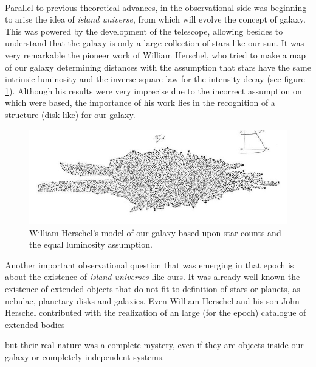 \

Parallel to previous theoretical advances, in the observational side was 
beginning to arise the idea of \textit{island universe}, from which will 
evolve the concept of galaxy. This was powered by the development of the 
telescope, allowing besides to understand that the galaxy is only a large 
collection of stars like our sun. It was very remarkable the pioneer work of 
William Herschel, who tried to make a map of our galaxy determining distances 
with the assumption that stars have the same intrinsic luminosity and the 
inverse square law for the intensity decay (see figure \ref{fig:HerschelModel}). 
Although his results were very imprecise due to the incorrect assumption on 
which were based, the importance of his work lies in the recognition of a 
structure (disk-like) for our galaxy. 

\begin{figure}[htbp]
	\centering
	\includegraphics[width=1.0\textwidth]{./figures/1_introduction/Herschel_Model.png}
	
	\caption{\small{William Herschel's model of our galaxy based upon star 
	counts and the equal luminosity assumption.\cite{Herschel1785}}}
	
	\label{fig:HerschelModel}
\end{figure}

Another important observational question that was emerging in that epoch is 
about the existence of \textit{island universes} like ours. It was already 
well known the existence of extended objects that do not fit to definition of
stars or planets, as nebulae, planetary disks and galaxies. Even William
Herschel and his son John Herschel contributed with the realization of an
large (for the epoch) catalogue of extended bodies

 but their real 
nature was a complete mystery, even if they are objects inside our galaxy 
or completely independent systems.






